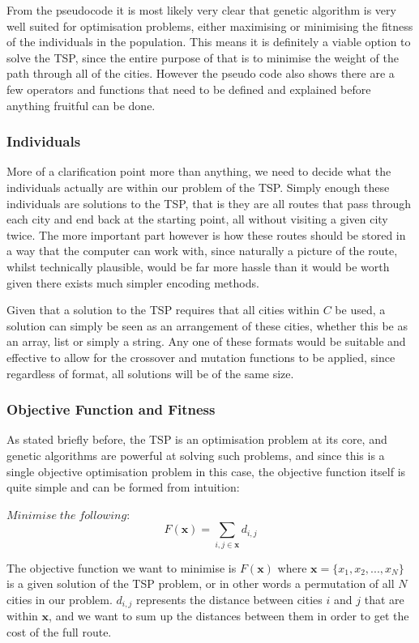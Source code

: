 \documentclass[11pt,a4paper,titlepage]{article}
\begin{document}
From the pseudocode it is most likely very clear that genetic algorithm is very well suited for optimisation problems, either maximising or minimising the fitness of the individuals in the population. This means it is definitely a viable option to solve the TSP, since the entire purpose of that is to minimise the weight of the path through all of the cities. However the pseudo code also shows there are a few operators and functions that need to be defined and explained before anything fruitful can be done.

\subsubsection{Individuals}

More of a clarification point more than anything, we need to decide what the individuals actually are within our problem of the TSP. Simply enough these individuals are solutions to the TSP, that is they are all routes that pass through each city and end back at the starting point, all without visiting a given city twice. The more important part however is how these routes should be stored in a way that the computer can work with, since naturally a picture of the route, whilst technically plausible, would be far more hassle than it would be worth given there exists much simpler encoding methods.

Given that a solution to the TSP requires that all cities within $C$ be used, a solution can simply be seen as an arrangement of these cities, whether this be as an array, list or simply a string. Any one of these formats would be suitable and effective to allow for the crossover and mutation functions to be applied, since regardless of format, all solutions will be of the same size.

\subsubsection{Objective Function and Fitness}

As stated briefly before, the TSP is an optimisation problem at its core, and genetic algorithms are powerful at solving such problems, and since this is a single objective optimisation problem in this case, the objective function itself is quite simple and can be formed from intuition:


$Minimise\; the\; following:$ \[F(\mathbf{x}) = \sum_{i,j \in \mathbf{x}} d_{i,j} \]

The objective function we want to minimise is $F(\mathbf{x})$ where $\mathbf{x} = \{x_1, x_2, ..., x_N\}$ is a given solution of the TSP problem, or in other words a permutation of all $N$ cities in our problem. $d_{i,j}$ represents the distance between cities $i$ and $j$ that are within $\mathbf{x}$, and we want to sum up the distances between them in order to get the cost of the full route.
\end{document}

